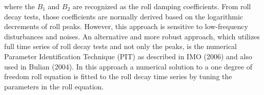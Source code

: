 




where the $B_1$ and $B_2$ are recognized as the roll damping coefficients.
From roll decay tests, those coefficients are normally derived based on the logarithmic decrements of roll peaks. However, this approach is sensitive to low-frequency disturbances and noises. An alternative and more robust approach, which utilizes full time series of roll decay tests and not only the peaks, is the numerical Parameter Identification Technique (PIT) as described in IMO (2006) and also used in Bulian (2004). In this approach a numerical solution to a one degree of freedom roll equation is fitted to the roll decay time series by tuning the parameters in the roll equation.



